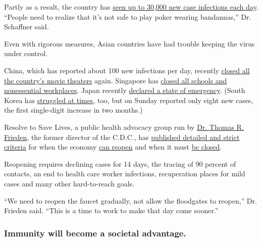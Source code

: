 Partly as a result, the country has
\href{https://www.worldometers.info/coronavirus/country/us/}{seen up to
30,000 new case infections each day}. ``People need to realize that it's
not safe to play poker wearing bandannas,'' Dr. Schaffner said.

Even with rigorous measures, Asian countries have had trouble keeping
the virus under control.

China, which has reported about 100 new infections per day, recently
\href{https://www.businessinsider.com/coronavirus-china-orders-all-movie-theaters-to-close-again-2020-3}{closed
all the country's movie theaters} again. Singapore has
\href{https://www.cnbc.com/2020/04/03/singapore-shuts-schools-temporarily-closes-workplaces-to-curb-coronavirus.html}{closed
all schools and nonessential workplaces}. Japan recently
\href{https://www.nytimes3xbfgragh.onion/2020/04/07/world/asia/japan-coronavirus-emergency.html}{declared
a state of emergency}. (South Korea has
\href{https://www.nbcnews.com/news/world/south-korea-s-return-normal-interrupted-uptick-coronavirus-cases-n1176021}{struggled
at times}, too, but on Sunday reported only eight new cases, the first
single-digit increase in two months.)

Resolve to Save Lives, a public health advocacy group run by
\href{https://resolvetosavelives.org/about/team/tom-frieden}{Dr. Thomas
R. Frieden}, the former director of the C.D.C., has
\href{https://vitalstrategies.zoom.us/rec/play/uJUkIe2t-m83SYeSsgSDA6UsW426e6qs1iBIq6Zeyk7kUHkCZlL0YLcSZOrv8sWG1OUPpKL9uf0WUssz?continueMode=true}{published
detailed and strict criteria} for when the economy
\href{https://preventepidemics.org/wp-content/uploads/2020/04/COV020_WhenHowLoosenFaucet_v4.pdf}{can
reopen} and when it must
\href{https://preventepidemics.org/wp-content/uploads/2020/04/COV020_WhenHowTightenFaucet_v3.pdf}{be
closed}.

Reopening requires declining cases for 14 days, the tracing of 90
percent of contacts, an end to health care worker infections,
recuperation places for mild cases and many other hard-to-reach goals.

``We need to reopen the faucet gradually, not allow the floodgates to
reopen,'' Dr. Frieden said. ``This is a time to work to make that day
come sooner.''

\hypertarget{immunity-will-become-a-societal-advantage}{%
\subsubsection{Immunity will become a societal
advantage.}\label{immunity-will-become-a-societal-advantage}}

